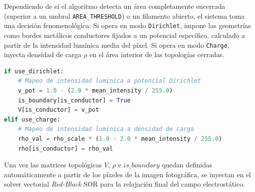 Dependiendo de si el algoritmo detecta un área completamente encerrada (superior a un umbral \texttt{AREA\_THRESHOLD}) o un filamento abierto, el sistema toma una decisión fenomenológica:
Si opera en modo \texttt{Dirichlet}, impone las geometrías como bordes metálicos conductores fijados a un potencial específico, calculado a partir de la intensidad lumínica media del píxel.
Si opera en modo \texttt{Charge}, inyecta densidad de carga $\rho$ en el área interior de las topologías cerradas.

\begin{lstlisting}[language=Python, caption=Asignación dinámica de condiciones físicas según la topología extraída por OpenCV.]
if use_dirichlet:
    # Mapeo de intensidad luminica a potencial Dirichlet
    v_pot = 1.0 - (2.0 * mean_intensity / 255.0)
    is_boundary[is_conductor] = True
    V[is_conductor] = v_pot
elif use_charge:
    # Mapeo de intensidad luminica a densidad de carga
    rho_val = rho_scale * (1.0 - 2.0 * mean_intensity / 255.0)
    rho[is_conductor] = rho_val
\end{lstlisting}

Una vez las matrices topológicas $V$, $\rho$ e $is\_boundary$ quedan definidas automáticamente a partir de los píxeles de la imagen fotográfica, se inyectan en el solver vectorial \textit{Red-Black} SOR para la relajación final del campo electrostático.